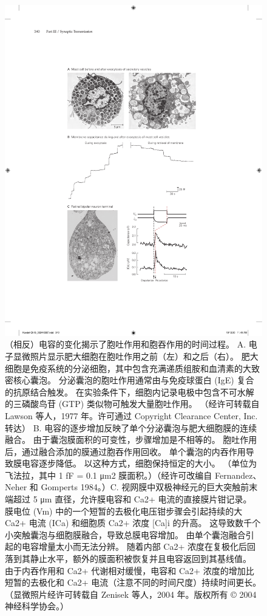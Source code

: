 \begin{figure}[htbp]
	\centering
	\includegraphics[width=0.65\linewidth]{chap15/fig_15_8}
	\caption{（相反）电容的变化揭示了胞吐作用和胞吞作用的时间过程。 A. 电子显微照片显示肥大细胞在胞吐作用之前（左）和之后（右）。 肥大细胞是免疫系统的分泌细胞，其中包含充满递质组胺和血清素的大致密核心囊泡。 分泌囊泡的胞吐作用通常由与免疫球蛋白 (IgE) 复合的抗原结合触发。 在实验条件下，细胞内记录电极中包含不可水解的三磷酸鸟苷 (GTP) 类似物可触发大量胞吐作用。 （经许可转载自 Lawson 等人，1977 年。许可通过 Copyright Clearance Center, Inc. 转达） B. 电容的逐步增加反映了单个分泌囊泡与肥大细胞膜的连续融合。 由于囊泡膜面积的可变性，步骤增加是不相等的。 胞吐作用后，通过融合添加的膜通过胞吞作用回收。 单个囊泡的内吞作用导致膜电容逐步降低。 以这种方式，细胞保持恒定的大小。 （单位为飞法拉，其中 1 fF = 0.1 μm2 膜面积。）（经许可改编自 Fernandez、Neher 和 Gomperts 1984。）C. 视网膜中双极神经元的巨大突触前末端超过 5 μm 直径，允许膜电容和 Ca2+ 电流的直接膜片钳记录。 膜电位 (Vm) 中的一个短暂的去极化电压钳步骤会引起持续的大 Ca2+ 电流 (ICa) 和细胞质 Ca2+ 浓度 [Ca]i 的升高。 这导致数千个小突触囊泡与细胞膜融合，导致总膜电容增加。 由单个囊泡融合引起的电容增量太小而无法分辨。 随着内部 Ca2+ 浓度在复极化后回落到其静止水平，额外的膜面积被恢复并且电容返回到其基线值。 由于内吞作用和 Ca2+ 代谢相对缓慢，电容和 Ca2+ 浓度的增加比短暂的去极化和 Ca2+ 电流（注意不同的时间尺度）持续时间更长。 （显微照片经许可转载自 Zenisek 等人，2004 年。版权所有 © 2004 神经科学协会。）}
	\label{fig:15_8}
\end{figure}


